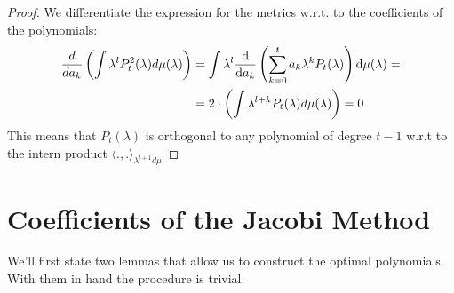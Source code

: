 \documentclass{article}
\begin{document}
\optimality*
\begin{proof}
We differentiate the expression for the metrics w.r.t. to the coefficients of the polynomials:
\begin{align*}
    \frac{d}{da_k}\left(\int \lambda^lP_t^2(\lambda)d\mu(\lambda)\right)&=\int\lambda^l\frac{\mathop{}\!\mathrm{d}}{\mathop{}\!\mathrm{d} a_k}\left(\sum_{k=0}^t a_k\lambda^kP_t(\lambda) \right) \mathop{}\!\mathrm{d} \mu(\lambda)=
    \\&=2\cdot\left(\int \lambda^{l+k}P_t(\lambda)d\mu(\lambda)\right)=0
\end{align*}
This means that $P_t(\lambda)$ is orthogonal to any polynomial of degree $t-1$  w.r.t to the intern product $\langle.,.\rangle_{\lambda^{l+1}d\mu}$

\end{proof}

\section{Coefficients  of the Jacobi Method}
We'll first state two lemmas that allow us to construct the optimal polynomials. With them in hand the procedure is trivial.
\end{document}
